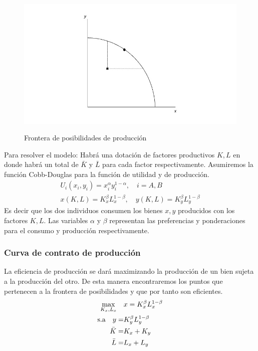 \begin{figure}[htbp]
    \centering
    \caption{Frontera de posibilidades de producción}
    \includegraphics[width=\textwidth]{Figuras/EQ Frontera de posibilidades de produccion.jpeg}
    \label{fig:diapositiva5}
\end{figure}

Para resolver el modelo: Habrá una dotación de factores productivos $K,L$ en donde habrá un total de $\bar{K}$ y $\bar{L}$ para cada factor respectivamente. Asumiremos la función Cobb-Douglas para la función de utilidad y de producción.  
\begin{align*}
    U_i (x_i,y_i) = x_i^\alpha y_i ^{1-\alpha},  \quad i = A,B \\
    x(K,L) = K_x^\beta L_x ^{1-\beta}, \quad y(K,L) = K_y^\beta L_y^{1-\beta}  
\end{align*}
Es decir que los dos individuos consumen los bienes $x,y$ producidos con los factores $K,L$. Las variables $\alpha$ y $\beta$ representan las preferencias y ponderaciones para el consumo y producción respectivamente. 

\subsubsection*{Curva de contrato de producción}

La eficiencia de producción se dará maximizando la producción de un bien sujeta a la producción del otro. De esta manera encontraremos los puntos que pertenecen a la frontera de posibilidades y que por tanto son eficientes. 
\begin{align*}
    \max _{K_x,L_x} \quad &x = K_x^\beta L_x^{1-\beta}\\
    \text{s.a} \quad  y =& K_y^\beta L_y^{1-\beta} \\
     \Bar{K} =& K_x + K_y \\
     \Bar{L} =& L_x + L_y
\end{align*}

